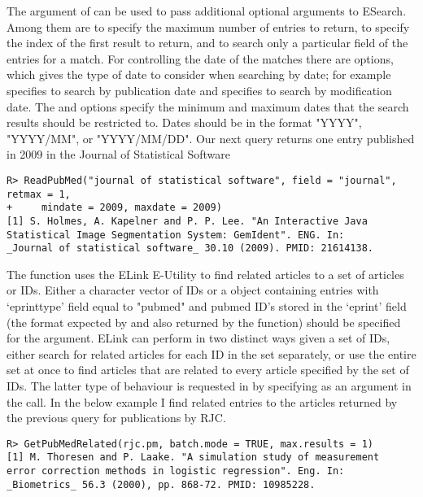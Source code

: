 \documentclass[article]{jss}\usepackage[]{graphicx}\usepackage[]{color}
\makeatletter
\newenvironment{kframe}{%
 \def\at@end@of@kframe{}%
 \ifinner\ifhmode%
  \def\at@end@of@kframe{\end{minipage}}%
  \begin{minipage}{\columnwidth}%
 \fi\fi%
 \def\FrameCommand##1{\hskip\@totalleftmargin \hskip-\fboxsep
 \colorbox{shadecolor}{##1}\hskip-\fboxsep
     \hskip-\linewidth \hskip-\@totalleftmargin \hskip\columnwidth}%
 \MakeFramed {\advance\hsize-\width
   \@totalleftmargin\z@ \linewidth\hsize
   \@setminipage}}%
 {\par\unskip\endMakeFramed%
 \at@end@of@kframe}
\newenvironment{knitrout}{}{} %
\makeatother
\begin{document}
The  argument of  can be used to pass additional optional arguments to ESearch.  Among them are  to specify the maximum number of entries to return,  to specify the index of the first result to return, and  to search only a particular field of the entries for a match.  For controlling the date of the matches there are options,  which gives the type of date to consider when searching by date; for example  specifies to search by publication date and  specifies to search by modification date.  The  and  options specify the minimum and maximum dates that the search results should be restricted to.  Dates should be in the format "YYYY", "YYYY/MM", or "YYYY/MM/DD".  Our next query returns one entry published in 2009 in the Journal of Statistical Software
\begin{knitrout}
\color{fgcolor}\begin{kframe}
\begin{verbatim}
R> ReadPubMed("journal of statistical software", field = "journal", retmax = 1, 
+     mindate = 2009, maxdate = 2009)
[1] S. Holmes, A. Kapelner and P. P. Lee. "An Interactive Java
Statistical Image Segmentation System: GemIdent". ENG. In:
_Journal of statistical software_ 30.10 (2009). PMID: 21614138.
\end{verbatim}
\end{kframe}
\end{knitrout}


The  function uses the ELink E-Utility to find related articles to a set of articles or IDs.  Either a character vector of IDs or a  object containing entries with `eprinttype' field equal to "pubmed" and pubmed ID's stored in the `eprint' field (the format expected by \Biblatex{} and also returned by the  function) should be specified for the  argument.  ELink can perform in two distinct ways given a set of IDs, either search for related articles for each ID in the set separately, or use the entire set at once to find articles that are related to every article specified by the set of IDs.  The latter type of behaviour is requested in  by specifying  as an argument in the call.  In the below example I find related entries to the articles returned by the previous query for publications by RJC.
\begin{knitrout}
\color{fgcolor}\begin{kframe}
\begin{verbatim}
R> GetPubMedRelated(rjc.pm, batch.mode = TRUE, max.results = 1)
[1] M. Thoresen and P. Laake. "A simulation study of measurement
error correction methods in logistic regression". Eng. In:
_Biometrics_ 56.3 (2000), pp. 868-72. PMID: 10985228.
\end{verbatim}
\end{kframe}
\end{knitrout}
\end{document}
